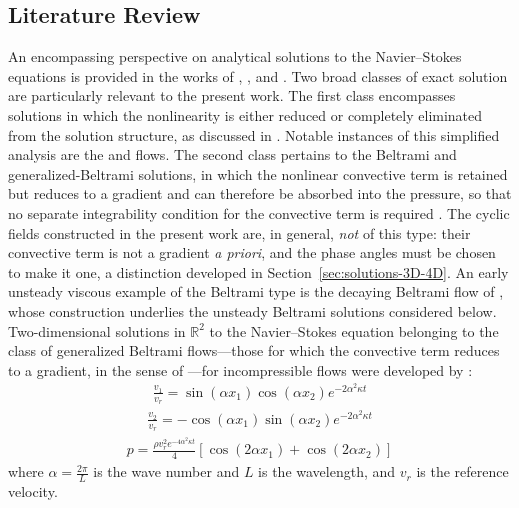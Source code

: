 \documentclass[11pt]{jfm}
\numberwithin{equation}{section}
\begin{document}
\subsection{Literature Review}
An encompassing perspective on analytical solutions to the Navier--Stokes equations is provided in the works of \cite{wan}, \cite{oka}, and \cite{lan}. Two broad classes of exact solution are particularly relevant to the present work. The
first class encompasses solutions in which the nonlinearity is either reduced or completely eliminated from the solution structure, as discussed in \cite{fox}. Notable instances of this simplified analysis are the \cite{cou} and \cite{poi} flows. The second class pertains to the Beltrami and generalized-Beltrami solutions, in which the nonlinear convective term is retained but reduces to a gradient and can therefore be absorbed
into the pressure, so that no separate integrability condition for the convective term is required
\citep{bel}. The cyclic fields constructed in the present work are, in general, \emph{not} of this type: their convective term is not a gradient \emph{a priori}, and the phase angles must be chosen to make it one, a distinction developed in Section~\ref{sec:solutions-3D-4D}. An early unsteady viscous example of the Beltrami type is the decaying Beltrami flow of \cite{trk}, whose construction underlies the unsteady Beltrami
solutions considered below. Two-dimensional solutions in $\mathbb{R}^2$ to the Navier--Stokes equation belonging to the class of generalized Beltrami flows---those for which the convective term reduces to a gradient, in the sense of \cite{wan2}---for incompressible flows were developed by \cite{tay}:
\begin{eqnarray}
\label{1.7}
\frac{v_1}{v_r} = \sin \left( \alpha x_1 \right)\cos \left( \alpha x_2 \right)e^{-2 \alpha^2 \kappa t}
\end{eqnarray}
\begin{eqnarray}
\label{1.8}
\frac{v_2}{v_r} = -\cos \left( \alpha x_1 \right)\sin \left( \alpha x_2 \right)e^{-2 \alpha^2 \kappa t}
\end{eqnarray}
\begin{eqnarray}
\label{1.9}
p = \frac{\rho v_r^2 e^{-4 \alpha^2 \kappa t}}{4} \left[ \cos \left( 2 \alpha x_1 \right) + \cos \left( 2 \alpha x_2 \right) \right]
\end{eqnarray}
where $\alpha = \frac{2\pi}{L}$ is the wave number and $L$ is the wavelength, and $v_r$ is the reference velocity.
\end{document}
